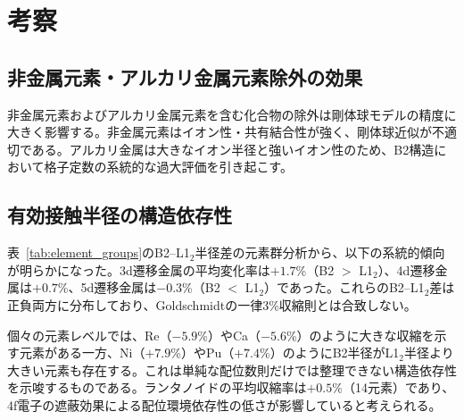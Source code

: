 \documentclass[a4paper,10pt,5p]{elsarticle}
\begin{document}
\section{考察}

\subsection{非金属元素・アルカリ金属元素除外の効果}
非金属元素およびアルカリ金属元素を含む化合物の除外は剛体球モデルの精度に大きく影響する。非金属元素はイオン性・共有結合性が強く、剛体球近似が不適切である。アルカリ金属は大きなイオン半径と強いイオン性のため、B2構造において格子定数の系統的な過大評価を引き起こす。

\begin{table}[htbp]
\small
    \centering
    \caption{非金属・アルカリ金属除外の効果。Before RMSEは従来のA-B接触のみモデル（除外前）、After RMSEは本研究のmax基準モデル（除外後）。}
    \label{tab:nonmetal_effect}
\end{table}


\subsection{有効接触半径の構造依存性}
表~\ref{tab:element_groups}のB2--L1$_2$半径差の元素群分析から、以下の系統的傾向が明らかになった。3d遷移金属の平均変化率は$+1.7$\%（B2 $>$ L1$_2$）、4d遷移金属は$+0.7$\%、5d遷移金属は$-0.3$\%（B2 $<$ L1$_2$）であった。これらのB2--L1$_2$差は正負両方に分布しており、Goldschmidtの一律3\%収縮則とは合致しない。

個々の元素レベルでは、Re（$-5.9$\%）やCa（$-5.6$\%）のように大きな収縮を示す元素がある一方、Ni（$+7.9$\%）やPu（$+7.4$\%）のようにB2半径がL1$_2$半径より大きい元素も存在する。これは単純な配位数則だけでは整理できない構造依存性を示唆するものである。ランタノイドの平均収縮率は$+0.5$\%（14元素）であり、4f電子の遮蔽効果による配位環境依存性の低さが影響していると考えられる。
\end{document}
